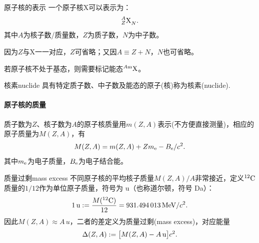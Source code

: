 \begin{definition}{原子核的表示}{}
	一个原子核X可以表示为：
	\[
		\nuclide[Z]{A}{X}_N.
	\]
	其中$A$为核子数/质量数，$Z$为质子数，$N$为中子数。
	
\end{definition}

\begin{remark}
	因为$Z$与X一一对应，$Z$可省略；又因$A \equiv Z + N$，$N$也可省略。
\end{remark}

\begin{remark}
	若原子核不处于基态，则需要标记能态$\nuclide{A\mathrm m}X$。
\end{remark}

\begin{definition}{核素}{nuclide}
	具有特定质子数、中子数及能态的原子(核)称为核素(nuclide).
\end{definition}

\paragraph{原子核的质量}质子数为$Z$、核子数为$A$的原子核质量用$m(Z,A)$表示(不方便直接测量)，相应的原子质量为$M(Z,A)$，有
\begin{equation}
	M(Z,A) = m(Z,A) + Zm_{\mathrm{e}} - B_{\mathrm{e}}/c^2.
\end{equation}
其中$m_{\mathrm{e}}$为电子质量，$B_{\mathrm{e}}$为电子结合能。

\begin{definition}{质量过剩}{mass excess}
	不同原子核的平均核子质量$M(Z,A)/A$非常接近，定义$\nuclide{12}C$质量的$1/12$作为单位原子质量，符号为 \unit{u}（也称道尔顿，符号 \unit{\dalton}）：
	\begin{equation}
		\qty{1}{u} := \frac{M(\nuclide{12}C)}{12} = \qty{931.494013}{MeV}/c^2.
	\end{equation}
	因此$M(Z,A) \approx A\,\unit{u}$，二者的差定义为质量过剩(mass excess)，对应能量
	\begin{align}
		\Delta(Z,A) := \bigb{M(Z,A) - A\,\unit{u}}c^2.
	\end{align}
\end{definition}
